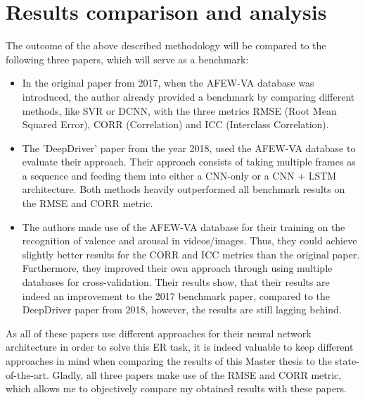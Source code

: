 \documentclass[11pt,a4paper]{scrbook}
\begin{document}

\chapter{Results comparison and analysis}
The outcome of the above described methodology will be compared to the following three papers, which will serve as a benchmark:
\begin{itemize}
    \item In the original paper from 2017, when the AFEW-VA database \citep{Kossaifi:2017:AFEW-VADatabase} was introduced, the author already provided a benchmark by comparing different methods, like SVR or DCNN, with the three metrics RMSE (Root Mean Squared Error), CORR (Correlation) and ICC (Interclass Correlation). 
    \item The 'DeepDriver' paper \citep{Theagarajan:2018:DeepDriver} from the year 2018, used the AFEW-VA database to evaluate their approach. Their approach consists of taking multiple frames as a sequence and feeding them into either a CNN-only or a CNN + LSTM architecture. Both methods heavily outperformed all benchmark results on the RMSE and CORR metric.
    \item The authors  \citet{Handrich:2020:SimultaneousPredVA} made use of the AFEW-VA database \citep{Kossaifi:2017:AFEW-VADatabase} for their training on the recognition of valence and arousal in videos/images. Thus, they could achieve slightly better results for the CORR and ICC metrics than the original paper. Furthermore, they improved their own approach through using multiple databases for cross-validation. Their results show, that their results are indeed an improvement to the 2017 benchmark paper, compared to the DeepDriver paper from 2018, however, the results are still lagging behind.
\end{itemize}

As all of these papers use different approaches for their neural network architecture in order to solve this \gls{ER} task, it is indeed valuable to keep different approaches in mind when comparing the results of this Master thesis to the state-of-the-art. Gladly, all three papers make use of the RMSE and CORR metric, which allows me to objectively compare my obtained results with these papers.


\end{document}
